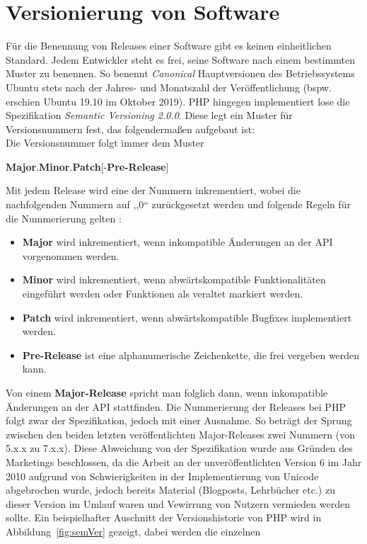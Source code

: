 \section{Versionierung von Software}
Für die Benennung von Releases einer Software gibt es keinen einheitlichen Standard. Jedem Entwickler steht es frei, seine
Software nach einem bestimmten Muster zu benennen. So benennt \textit{Canonical} Hauptversionen des Betriebssystems Ubuntu stets nach der 
Jahres- und Monatszahl der Veröffentlichung (bspw. erschien Ubuntu 19.10 im Oktober 2019). \ac{PHP} hingegen implementiert
lose die Spezifikation \textit{Semantic Versioning 2.0.0}. Diese legt ein Muster für Versionsnummern fest, das 
folgendermaßen aufgebaut ist: \\
Die Versionsnummer folgt immer dem Muster \\ \centerline{\textbf{Major}.\textbf{Minor}.\textbf{Patch}{[-\textbf{Pre-Release}]}}
Mit jedem Release wird eine der Nummern inkrementiert, wobei die nachfolgenden Nummern auf ,,0`` zurückgesetzt werden 
und folgende Regeln für die Nummerierung gelten \cite{preston-werner_semantic_nodate}:
\begin{itemize}
    \item \textbf{Major} wird inkrementiert, wenn inkompatible Änderungen an der API vorgenommen werden.
    \item \textbf{Minor} wird inkrementiert, wenn abwärtskompatible Funktionalitäten eingeführt werden oder Funktionen als veraltet markiert werden.
    \item \textbf{Patch} wird inkrementiert, wenn abwärtskompatible Bugfixes implementiert werden.
    \item \textbf{Pre-Release} ist eine alphanumerische Zeichenkette, die frei vergeben werden kann.
\end{itemize}
Von einem \textbf{Major-Release} spricht man folglich dann, wenn inkompatible Änderungen an der API stattfinden. 
Die Nummerierung der Releases bei \ac{PHP} folgt zwar der Spezifikation, jedoch mit einer Ausnahme. So beträgt der 
Sprung zwischen den beiden letzten veröffentlichten Major-Releases zwei Nummern (von 5.x.x zu 7.x.x). Diese Abweichung 
von der Spezifikation wurde aus Gründen des Marketings beschlossen, da die Arbeit an der unveröffentlichten Version 6 
im Jahr 2010 aufgrund von Schwierigkeiten in der Implementierung von Unicode abgebrochen wurde, jedoch bereits Material 
(Blogposts, Lehrbücher etc.) zu dieser Version im Umlauf waren und Vewirrung von Nutzern vermieden werden sollte.
Ein beispielhafter Auschnitt der Versionshistorie von \ac{PHP} wird in Abbildung~\ref{fig:semVer} gezeigt, dabei werden die einzelnen
